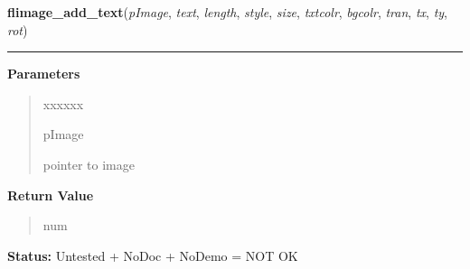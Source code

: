 \hspace{.8\funcindent}\begin{boxedminipage}{\funcwidth}

    \raggedright \textbf{flimage\_add\_text}(\textit{pImage}, \textit{text}, \textit{length}, \textit{style}, \textit{size}, \textit{txtcolr}, \textit{bgcolr}, \textit{tran}, \textit{tx}, \textit{ty}, \textit{rot})

    \vspace{-1.5ex}

    \rule{\textwidth}{0.5\fboxrule}
\setlength{\parskip}{2ex}
\setlength{\parskip}{1ex}
      \textbf{Parameters}
      \vspace{-1ex}

      \begin{quote}
        \begin{Ventry}{xxxxxx}

          \item[pImage]

          pointer to image

        \end{Ventry}

      \end{quote}

      \textbf{Return Value}
    \vspace{-1ex}

      \begin{quote}
      num

      \end{quote}

\textbf{Status:} Untested + NoDoc + NoDemo = NOT OK



    \end{boxedminipage}

    \label{xformslib:flflimage:flimage_add_text_struct}

    \vspace{0.5ex}

